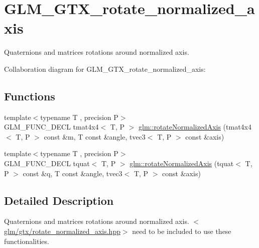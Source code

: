 \hypertarget{group__gtx__rotate__normalized__axis}{\section{G\-L\-M\-\_\-\-G\-T\-X\-\_\-rotate\-\_\-normalized\-\_\-axis}
\label{group__gtx__rotate__normalized__axis}
}


Quaternions and matrices rotations around normalized axis.  


Collaboration diagram for G\-L\-M\-\_\-\-G\-T\-X\-\_\-rotate\-\_\-normalized\-\_\-axis\-:
\subsection*{Functions}
\begin{DoxyCompactItemize}
\item 
{\footnotesize template$<$typename T , precision P$>$ }\\G\-L\-M\-\_\-\-F\-U\-N\-C\-\_\-\-D\-E\-C\-L tmat4x4$<$ T, P $>$ \hyperlink{group__gtx__rotate__normalized__axis_gaada623964a895def5a8b77b5b7887dc4}{glm\-::rotate\-Normalized\-Axis} (tmat4x4$<$ T, P $>$ const \&m, T const \&angle, tvec3$<$ T, P $>$ const \&axis)
\item 
{\footnotesize template$<$typename T , precision P$>$ }\\G\-L\-M\-\_\-\-F\-U\-N\-C\-\_\-\-D\-E\-C\-L tquat$<$ T, P $>$ \hyperlink{group__gtx__rotate__normalized__axis_ga6c00234d844faef36a6a94669fbd1639}{glm\-::rotate\-Normalized\-Axis} (tquat$<$ T, P $>$ const \&q, T const \&angle, tvec3$<$ T, P $>$ const \&axis)
\end{DoxyCompactItemize}


\subsection{Detailed Description}
Quaternions and matrices rotations around normalized axis. $<$\hyperlink{rotate__normalized__axis_8hpp}{glm/gtx/rotate\-\_\-normalized\-\_\-axis.\-hpp}$>$ need to be included to use these functionalities. 

